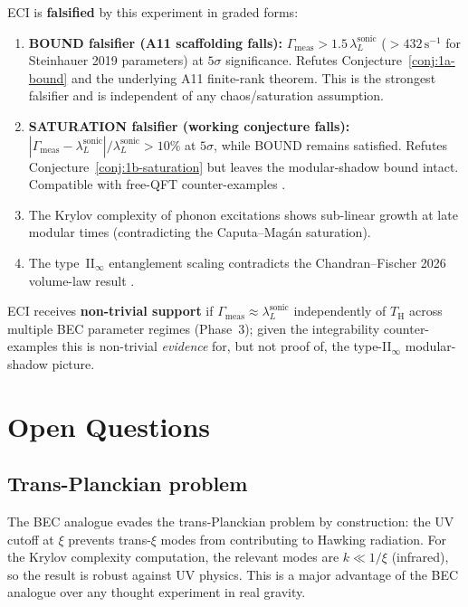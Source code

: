 \documentclass[12pt,a4paper]{article}
\renewcommand{\TH}{T_{\mathrm{H}}}
\newcommand{\lambdaL}{\lambda_L^{\mathrm{sonic}}}
\begin{document}
ECI is \textbf{falsified} by this experiment in graded forms:
\begin{enumerate}
  \item \textbf{BOUND falsifier (A11 scaffolding falls):}
    $\Gamma_{\mathrm{meas}} > 1.5\,\lambdaL$
    ($> 432\,\mathrm{s}^{-1}$ for Steinhauer 2019 parameters)
    at $5\sigma$ significance.  Refutes
    Conjecture~\ref{conj:1a-bound} and the underlying A11 finite-rank
    theorem.  This is the strongest falsifier and is independent of
    any chaos/saturation assumption.
  \item \textbf{SATURATION falsifier (working conjecture falls):}
    $|\Gamma_{\mathrm{meas}} - \lambdaL|/\lambdaL > 10\%$
    at $5\sigma$, while BOUND remains satisfied.  Refutes
    Conjecture~\ref{conj:1b-saturation} but leaves the modular-shadow
    bound intact.  Compatible with free-QFT counter-examples
    \cite{avdoshkin2019,camargo2022,sreeram2025}.
  \item The Krylov complexity of phonon excitations shows sub-linear
    growth at late modular times (contradicting the Caputa--Mag\'an
    saturation).
  \item The type~II$_\infty$ entanglement scaling contradicts the
    Chandran--Fischer 2026 volume-law result \cite{chandran2026}.
\end{enumerate}
ECI receives \textbf{non-trivial support} if $\Gamma_{\mathrm{meas}}
\approx \lambdaL$ independently of $\TH$ across multiple BEC parameter
regimes (Phase~3); given the integrability counter-examples this is
non-trivial \emph{evidence} for, but not proof of, the type-II$_\infty$
modular-shadow picture.

\section{Open Questions}
\label{sec:open}

\subsection{Trans-Planckian problem}

The BEC analogue evades the trans-Planckian problem \cite{jacobson1991}
by construction: the UV cutoff at $\xi$ prevents trans-$\xi$ modes from
contributing to Hawking radiation.
For the Krylov complexity computation, the relevant modes are $k \ll 1/\xi$
(infrared), so the result is robust against UV physics.
This is a major advantage of the BEC analogue over any thought experiment
in real gravity.
\end{document}
